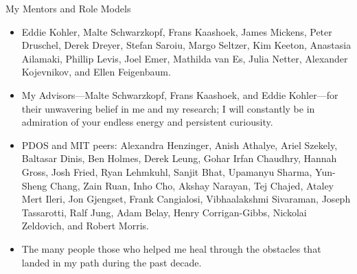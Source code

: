 \begin{center}{My Mentors and Role Models}\end{center} 
    \begin{itemize}
        \item Eddie Kohler, Malte Schwarzkopf, Frans
            Kaashoek, James Mickens, Peter Druschel, Derek Dreyer, Stefan
            Saroiu, Margo Seltzer, Kim Keeton, Anastasia Ailamaki, Phillip
            Levis, Joel Emer, Mathilda van Es, Julia Netter, Alexander
            Kojevnikov, and Ellen
            Feigenbaum.

        \item My Advisors---Malte Schwarzkopf, Frans Kaashoek, and Eddie
            Kohler---for their unwavering belief in me and my research; I will
            constantly be in admiration of your endless energy and persistent
            curiousity.

        \item PDOS and MIT peers: 
            Alexandra Henzinger, Anish Athalye, Ariel Szekely, Baltasar Dinis, Ben Holmes,
            Derek Leung, Gohar Irfan Chaudhry, Hannah Gross, Josh Fried, Ryan
            Lehmkuhl, Sanjit Bhat, Upamanyu Sharma, Yun-Sheng Chang, Zain
            Ruan, Inho Cho,
            Akshay Narayan, Tej Chajed, Ataley Mert Ileri, Jon Gjengset, Frank Cangialosi,
            Vibhaalakshmi Sivaraman, Joseph Tassarotti, Ralf Jung, Adam Belay,
            Henry Corrigan-Gibbs, Nickolai Zeldovich, and Robert Morris.

        \item The many people those who helped me heal through the obstacles that
            landed in my path during the past decade.  
    \end{itemize}
    

